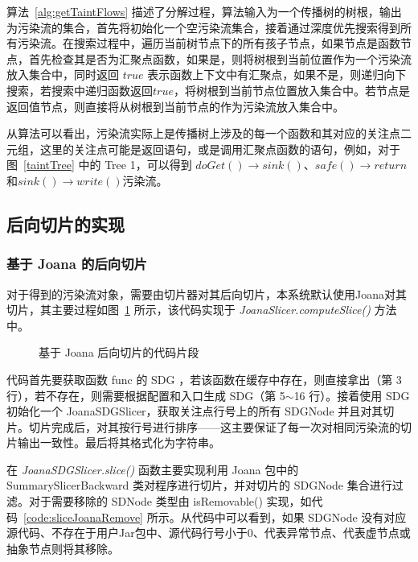 算法~\ref{alg:getTaintFlows} 描述了分解过程，算法输入为一个传播树的树根，输出为污染流的集合，首先将初始化一个空污染流集合，接着通过深度优先搜索得到所有污染流。在搜索过程中，遍历当前树节点下的所有孩子节点，如果节点是函数节点，首先检查其是否为汇聚点函数，如果是，则将树根到当前位置作为一个污染流放入集合中，同时返回 $true$ 表示函数上下文中有汇聚点，如果不是，则递归向下搜索，若搜索中递归函数返回$true$，将树根到当前节点位置放入集合中。若节点是返回值节点，则直接将从树根到当前节点的作为污染流放入集合中。

从算法可以看出，污染流实际上是传播树上涉及的每一个函数和其对应的关注点二元组，这里的关注点可能是返回语句，或是调用汇聚点函数的语句，例如，对于图~\ref{taintTree} 中的 Tree 1，可以得到 $doGet() \rightarrow sink()$、$safe() \rightarrow return$和$sink() \rightarrow write()$污染流。

\subsection{后向切片的实现}
\subsubsection{基于 Joana 的后向切片}
对于得到的污染流对象，需要由切片器对其后向切片，本系统默认使用Joana对其切片，其主要过程如图~\ref{code:sliceJoana} 所示，该代码实现于 \textit{JoanaSlicer.computeSlice()} 方法中。

\begin{figure}[!htbp]
    \centering
    \begin{minipage}{0.9\textwidth}
        
    \end{minipage}
\caption{基于 Joana 后向切片的代码片段}\label{code:sliceJoana}
\end{figure}

代码首先要获取函数 func 的 SDG ，若该函数在缓存中存在，则直接拿出（第 3 行），若不存在，则需要根据配置和入口生成 SDG（第 5$\sim$16 行）。接着使用 SDG 初始化一个 JoanaSDGSlicer，获取关注点行号上的所有 SDGNode 并且对其切片。切片完成后，对其按行号进行排序——这主要保证了每一次对相同污染流的切片输出一致性。最后将其格式化为字符串。

在 \textit{JoanaSDGSlicer.slice()} 函数主要实现利用 Joana 包中的 SummarySlicerBackward 类对程序进行切片，并对切片的 SDGNode 集合进行过滤。对于需要移除的 SDNode 类型由 isRemovable() 实现，如代码~\ref{code:sliceJoanaRemove} 所示。从代码中可以看到，如果 SDGNode 没有对应源代码、不存在于用户Jar包中、源代码行号小于0、代表异常节点、代表虚节点或抽象节点则将其移除。

